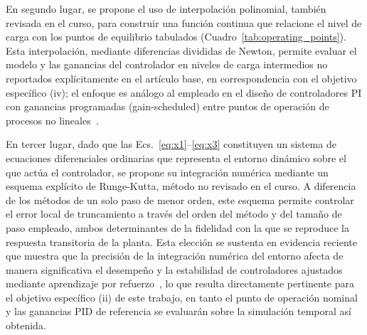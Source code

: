 \documentclass[final,5p,times,twocolumn,authoryear,11pt]{elsarticle}
\begin{document}
En segundo lugar, se propone el uso de interpolación polinomial, también revisada en el curso, para construir una función continua que relacione el nivel de carga con los puntos de equilibrio tabulados (Cuadro~\ref{tab:operating_points}). Esta interpolación, mediante diferencias divididas de Newton, permite evaluar el modelo y las ganancias del controlador en niveles de carga intermedios no reportados explícitamente en el artículo base, en correspondencia con el objetivo específico (iv); el enfoque es análogo al empleado en el diseño de controladores PI con ganancias programadas (gain-scheduled) entre puntos de operación de procesos no lineales~\citep{gao2005design}.

En tercer lugar, dado que las Ecs.~\eqref{eq:x1}--\eqref{eq:x3} constituyen un sistema de ecuaciones diferenciales ordinarias que representa el entorno dinámico sobre el que actúa el controlador, se propone su integración numérica mediante un esquema explícito de Runge-Kutta, método no revisado en el curso. A diferencia de los métodos de un solo paso de menor orden, este esquema permite controlar el error local de truncamiento a través del orden del método y del tamaño de paso empleado, ambos determinantes de la fidelidad con la que se reproduce la respuesta transitoria de la planta. Esta elección se sustenta en evidencia reciente que muestra que la precisión de la integración numérica del entorno afecta de manera significativa el desempeño y la estabilidad de controladores ajustados mediante aprendizaje por refuerzo~\citep{bajrami2026modelling}, lo que resulta directamente pertinente para el objetivo específico (ii) de este trabajo, en tanto el punto de operación nominal y las ganancias PID de referencia se evaluarán sobre la simulación temporal así obtenida.

\clearpage
\end{document}
